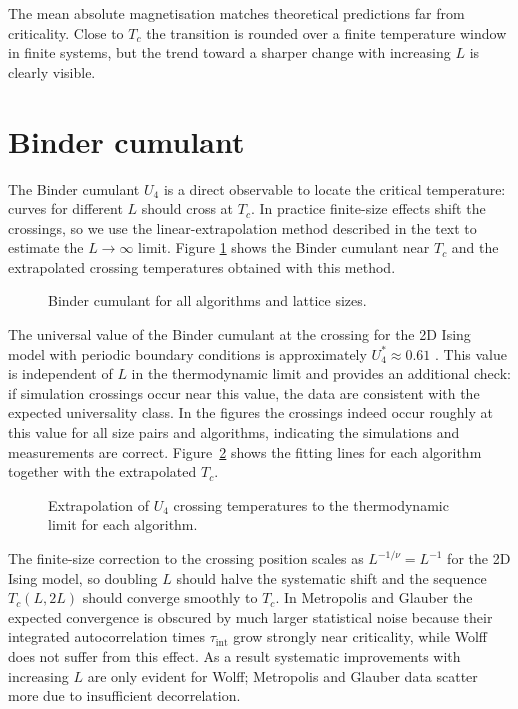 The mean absolute magnetisation matches theoretical predictions far from criticality. Close to $T_c$ the transition is rounded over a finite temperature window in finite systems, but the trend toward a sharper change with increasing $L$ is clearly visible.

\section{Binder cumulant}

The Binder cumulant $U_4$ is a direct observable to locate the critical temperature: curves for different $L$ should cross at $T_c$. In practice finite-size effects shift the crossings, so we use the linear-extrapolation method described in the text to estimate the $L\to\infty$ limit. Figure \ref{fig:u4} shows the Binder cumulant near $T_c$ and the extrapolated crossing temperatures obtained with this method.

\begin{figure}
  \centering
    
    \caption{Binder cumulant for all algorithms and lattice sizes.}
    \label{fig:u4}
\end{figure}

The universal value of the Binder cumulant at the crossing for the 2D Ising model with periodic boundary conditions is approximately $U_4^*\approx0.61$ \citep{Binder1981}. This value is independent of $L$ in the thermodynamic limit and provides an additional check: if simulation crossings occur near this value, the data are consistent with the expected universality class. In the figures the crossings indeed occur roughly at this value for all size pairs and algorithms, indicating the simulations and measurements are correct. Figure~\ref{fig:extrp_u4} shows the fitting lines for each algorithm together with the extrapolated $T_c$.

\begin{figure}
  \centering
    
    \caption{Extrapolation of $U_4$ crossing temperatures to the thermodynamic limit for each algorithm.}
    \label{fig:extrp_u4}
\end{figure}

The finite-size correction to the crossing position scales as $L^{-1/\nu}=L^{-1}$ for the 2D Ising model, so doubling $L$ should halve the systematic shift and the sequence $T_c(L,2L)$ should converge smoothly to $T_c$. In Metropolis and Glauber the expected convergence is obscured by much larger statistical noise because their integrated autocorrelation times $\tau_{\mathrm{int}}$ grow strongly near criticality, while Wolff does not suffer from this effect. As a result systematic improvements with increasing $L$ are only evident for Wolff; Metropolis and Glauber data scatter more due to insufficient decorrelation.

